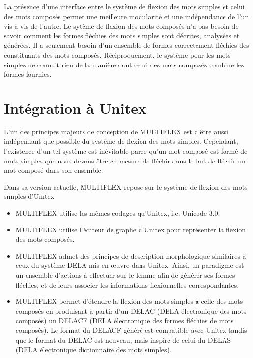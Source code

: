 \bigskip
\noindent La présence d'une interface entre le système de flexion des mots simples et celui des mots
composés permet une meilleure modularité et une indépendance de l'un vis-à-vis de l'autre. 
Le sytème de flexion des mots composés n'a pas besoin de savoir comment les formes fléchies des mots
simples sont décrites, analysées et générées. Il a seulement besoin d'un ensemble de formes
correctement fléchies des constituants des mots composés. Réciproquement, le système pour les mots
simples ne connait rien de la manière dont celui des mots composés combine les formes fournies.        
 
\section{Intégration à Unitex}
\label{section:UNITEXinterface}
L'un des principes majeurs de conception de MULTIFLEX est d'être aussi indépendant que possible du
système de flexion des mots simples. Cependant, l'existence d'un tel système est inévitable parce
qu'un mot composé est formé de mots simples que nous devons être en mesure de fléchir dans le but
de fléchir un mot composé dans son ensemble.

\bigskip
\noindent Dans sa version actuelle, MULTIFLEX repose sur le système de flexion des mots simples
d'Unitex

\begin{itemize}
\item MULTIFLEX utilise les mêmes codages qu'Unitex, i.e. Unicode 3.0.
\item MULTIFLEX utilise l'éditeur de graphe d'Unitex pour représenter la flexion des mots composés.
\item MULTIFLEX admet des principes de description morphologique similaires à ceux 
du système DELA mis en {\oe}uvre dans Unitex. Ainsi, un paradigme est un ensemble d'actions à effectuer sur le lemme afin de générer ses formes fléchies, et de leurs associer 
les informations flexionnelles correspondantes.
\item MULTIFLEX permet d'étendre la flexion des mots simples à celle des mots composés en produisant
à partir d'un DELAC (DELA électronique des mots composés) un DELACF (DELA électronique des formes
fléchies de mots composés).
Le format du DELACF généré est compatible avec Unitex tandis que le format du DELAC est nouveau,
mais inspiré de celui du DELAS (DELA électronique dictionnaire des mots simples).
\end{itemize}

